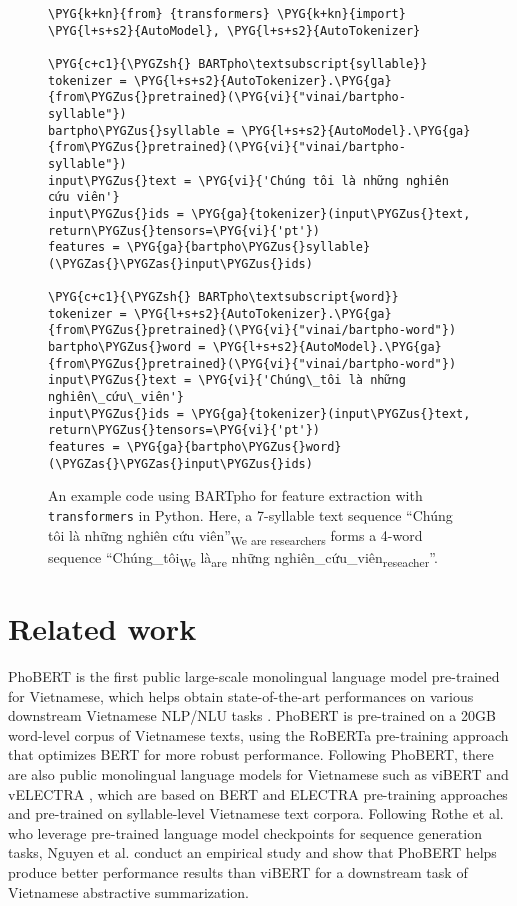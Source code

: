\documentclass[a4paper]{article}
\makeatletter
\def\PYG@reset{\let\PYG@it=\relax \let\PYG@bf=\relax \let\PYG@ul=\relax \let\PYG@tc=\relax \let\PYG@bc=\relax \let\PYG@ff=\relax}
\def\PYG@tok#1{\csname PYG@tok@#1\endcsname}
\def\PYG@toks#1+{\ifx\relax#1\empty\else \PYG@tok{#1}\expandafter\PYG@toks\fi}
\def\PYG@do#1{\PYG@bc{\PYG@tc{\PYG@ul{\PYG@it{\PYG@bf{\PYG@ff{#1}}}}}}}
\def\PYG#1#2{\PYG@reset\PYG@toks#1+\relax+\PYG@do{#2}}
\def\PYGZus{\char`\_}
\def\PYGZsh{\char`\#}
\def\PYGZas{$\ast$}
\makeatother
\begin{document}
\begin{figure*}[!t]
\begin{Verbatim}[commandchars=\\\{\}]
\PYG{k+kn}{from} {transformers} \PYG{k+kn}{import} \PYG{l+s+s2}{AutoModel}, \PYG{l+s+s2}{AutoTokenizer}

\PYG{c+c1}{\PYGZsh{} BARTpho\textsubscript{syllable}}
tokenizer = \PYG{l+s+s2}{AutoTokenizer}.\PYG{ga}{from\PYGZus{}pretrained}(\PYG{vi}{"vinai/bartpho-syllable"})
bartpho\PYGZus{}syllable = \PYG{l+s+s2}{AutoModel}.\PYG{ga}{from\PYGZus{}pretrained}(\PYG{vi}{"vinai/bartpho-syllable"})
input\PYGZus{}text = \PYG{vi}{'Chúng tôi là những nghiên cứu viên'}
input\PYGZus{}ids = \PYG{ga}{tokenizer}(input\PYGZus{}text, return\PYGZus{}tensors=\PYG{vi}{'pt'})
features = \PYG{ga}{bartpho\PYGZus{}syllable}(\PYGZas{}\PYGZas{}input\PYGZus{}ids)

\PYG{c+c1}{\PYGZsh{} BARTpho\textsubscript{word}}
tokenizer = \PYG{l+s+s2}{AutoTokenizer}.\PYG{ga}{from\PYGZus{}pretrained}(\PYG{vi}{"vinai/bartpho-word"})
bartpho\PYGZus{}word = \PYG{l+s+s2}{AutoModel}.\PYG{ga}{from\PYGZus{}pretrained}(\PYG{vi}{"vinai/bartpho-word"})
input\PYGZus{}text = \PYG{vi}{'Chúng\_tôi là những nghiên\_cứu\_viên'}
input\PYGZus{}ids = \PYG{ga}{tokenizer}(input\PYGZus{}text, return\PYGZus{}tensors=\PYG{vi}{'pt'})
features = \PYG{ga}{bartpho\PYGZus{}word}(\PYGZas{}\PYGZas{}input\PYGZus{}ids)
\end{Verbatim}
\caption{An example code using BARTpho for feature extraction with \texttt{transformers} in Python. Here, a 7-syllable text sequence ``Chúng tôi là những nghiên cứu viên''\textsubscript{We are researchers} forms a 4-word sequence ``Chúng\_tôi\textsubscript{We} là\textsubscript{are} những nghiên\_cứu\_viên\textsubscript{reseacher}''.}
\label{fig:code}
\end{figure*}


\section{Related work}

PhoBERT \cite{nguyen-tuan-nguyen-2020-phobert} is the first public large-scale monolingual language model pre-trained for Vietnamese, which helps obtain  state-of-the-art performances on various downstream Vietnamese NLP/NLU tasks \cite{PhoNER_COVID19, phonlp, JointIDSF,aspectvnamese,vitext2sql}. PhoBERT is pre-trained on a 20GB word-level corpus of Vietnamese texts, using the RoBERTa pre-training approach \cite{RoBERTa} that optimizes BERT for more robust performance. Following PhoBERT, there are also public monolingual language models for Vietnamese such as viBERT and vELECTRA \cite{bui-etal-2020-improving}, which are based on BERT and ELECTRA pre-training approaches \cite{devlin-etal-2019-bert,clark2020electra} and pre-trained on syllable-level Vietnamese text corpora. Following  Rothe et al. \cite{rothe-etal-2020-leveraging} who leverage pre-trained language model checkpoints for sequence generation tasks, Nguyen et al. \cite{vietsum} conduct an empirical study and show that PhoBERT helps produce better performance results than viBERT for a downstream task of Vietnamese abstractive summarization. 
\end{document}
